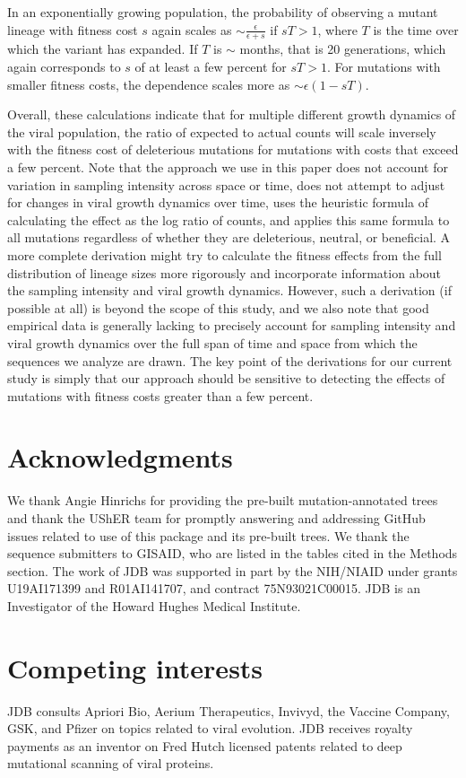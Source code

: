 \documentclass[9pt,twocolumn,twoside]{gsajnl_modified}
\begin{document}
{In an exponentially growing population, the probability of observing a mutant lineage with fitness cost $s$ again scales as $\sim \frac{\epsilon}{\epsilon + s}$ if $sT>1$, where $T$ is the time over which the variant has expanded.
If $T$ is $\sim$ months, that is 20 generations, which again corresponds to $s$ of at least a few percent for $sT > 1$.
For mutations with smaller fitness costs, the dependence scales more as $\sim \epsilon\left(1-sT\right)$.

Overall, these calculations indicate that for multiple different growth dynamics of the viral population, the ratio of expected to actual counts will scale inversely with the fitness cost of deleterious mutations for mutations with costs that exceed a few percent.
Note that the approach we use in this paper does not account for variation in sampling intensity across space or time, does not attempt to adjust for changes in viral growth dynamics over time, uses the heuristic formula of calculating the effect as the log ratio of counts, and applies this same formula to all mutations regardless of whether they are deleterious, neutral, or beneficial.
A more complete derivation might try to calculate the fitness effects from the full distribution of lineage sizes more rigorously and incorporate information about the sampling intensity and viral growth dynamics.
However, such a derivation (if possible at all) is beyond the scope of this study, and we also note that good empirical data is generally lacking to precisely account for sampling intensity and viral growth dynamics over the full span of time and space from which the sequences we analyze are drawn.
The key point of the derivations for our current study is simply that our approach should be sensitive to detecting the effects of mutations with fitness costs greater than a few percent.

\section{Acknowledgments}
We thank Angie Hinrichs for providing the pre-built mutation-annotated trees and thank the UShER team for promptly answering and addressing GitHub issues related to use of this package and its pre-built trees.
We thank the sequence submitters to GISAID, who are listed in the tables cited in the Methods section.
The work of JDB was supported in part by the NIH/NIAID under grants U19AI171399 and R01AI141707, and contract 75N93021C00015.
JDB is an Investigator of the Howard Hughes Medical Institute.

\section{Competing interests}
JDB consults Apriori Bio, Aerium Therapeutics, Invivyd, the Vaccine Company, GSK, and Pfizer on topics related to viral evolution.
JDB receives royalty payments as an inventor on Fred Hutch licensed patents related to deep mutational scanning of viral proteins.


}
\end{document}
